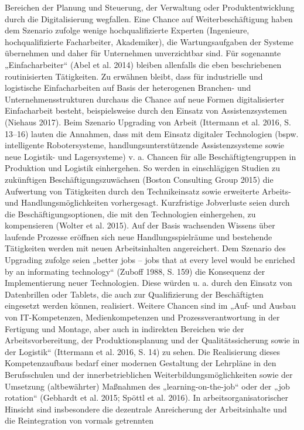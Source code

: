 Bereichen der Planung und Steuerung, der Verwaltung
oder Produktentwicklung durch die Digitalisierung
wegfallen. Eine Chance auf Weiterbeschäftigung haben dem Szenario zufolge wenige hochqualifizierte
Experten (Ingenieure, hochqualifizierte Facharbeiter,
Akademiker), die Wartungsaufgaben der Systeme
übernehmen und daher für Unternehmen unverzichtbar sind. Für sogenannte „Einfacharbeiter“ (Abel et al.
2014) bleiben allenfalls die eben beschriebenen routinisierten Tätigkeiten. Zu erwähnen bleibt, dass für
industrielle und logistische Einfacharbeiten auf Basis
der heterogenen Branchen- und Unternehmensstrukturen durchaus die Chance auf neue Formen digitalisierter Einfacharbeit besteht, beispielsweise durch den
Einsatz von Assistenzsystemen (Niehaus 2017).
Beim Szenario Upgrading von Arbeit (Ittermann et
al. 2016, S. 13–16) lauten die Annahmen, dass mit dem
Einsatz digitaler Technologien (bspw. intelligente Robotersysteme, handlungsunterstützende Assistenzsysteme sowie neue Logistik- und Lagersysteme) v. a.
Chancen für alle Beschäftigtengruppen in Produktion
und Logistik einhergehen. So werden in einschlägigen
Studien zu zukünftigen Beschäftigungszuwächsen
(Boston Consulting Group 2015) die Aufwertung von
Tätigkeiten durch den Technikeinsatz sowie erweiterte
Arbeits- und Handlungsmöglichkeiten vorhergesagt.
Kurzfristige Jobverluste seien durch die Beschäftigungsoptionen, die mit den Technologien einhergehen, zu kompensieren (Wolter et al. 2015). Auf der
Basis wachsenden Wissens über laufende Prozesse
eröffnen sich neue Handlungsspielräume und bestehende Tätigkeiten werden mit neuen Arbeitsinhalten
angereichert. Dem Szenario des Upgrading zufolge
seien „better jobs – jobs that at every level would be
enriched by an informating technology“ (Zuboff 1988,
S. 159) die Konsequenz der Implementierung neuer
Technologien. Diese würden u. a. durch den Einsatz
von Datenbrillen oder Tablets, die auch zur Qualifizierung der Beschäftigten eingesetzt werden können, realisiert. Weitere Chancen sind im „Auf- und Ausbau
von IT-Kompetenzen, Medienkompetenzen und Prozessverantwortung in der Fertigung und Montage,
aber auch in indirekten Bereichen wie der Arbeitsvorbereitung, der Produktionsplanung und der Qualitätssicherung sowie in der Logistik“ (Ittermann et al. 2016,
S. 14) zu sehen. Die Realisierung dieses Kompetenzaufbaus bedarf einer modernen Gestaltung der Lehrpläne in den Berufsschulen und der innerbetrieblichen
Weiterbildungsmöglichkeiten sowie der Umsetzung
(altbewährter) Maßnahmen des „learning-on-the-job“
oder der „job rotation“ (Gebhardt et al. 2015; Spöttl et
al. 2016). In arbeitsorganisatorischer Hinsicht sind insbesondere die dezentrale Anreicherung der Arbeitsinhalte und die Reintegration von vormals getrennten
